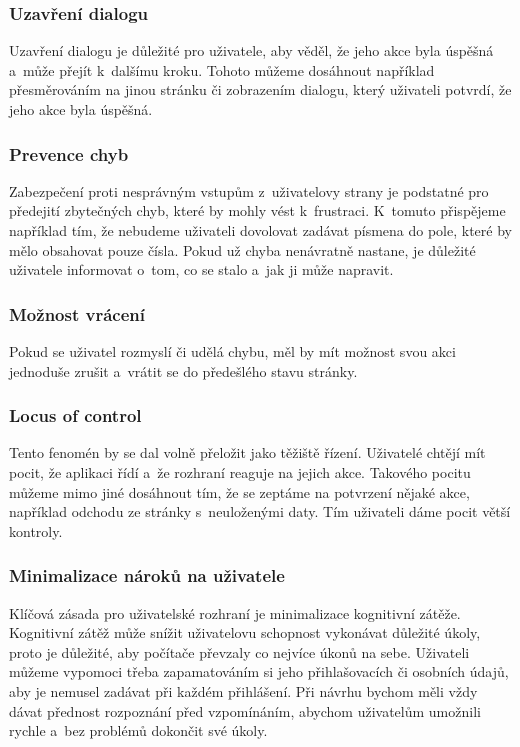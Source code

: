 \subsubsection*{Uzavření dialogu}
Uzavření dialogu je důležité pro uživatele, aby věděl, že jeho akce byla úspěšná a~může přejít k~dalšímu kroku. Tohoto můžeme dosáhnout například přesměrováním na jinou stránku či zobrazením dialogu, který uživateli potvrdí, že jeho akce byla úspěšná.

\subsubsection*{Prevence chyb}
Zabezpečení proti nesprávným vstupům z~uživatelovy strany je podstatné pro předejití zbytečných chyb, které by mohly vést k~frustraci. K~tomuto přispějeme například tím, že nebudeme uživateli dovolovat zadávat písmena do pole, které by mělo obsahovat pouze čísla. Pokud už chyba nenávratně nastane, je důležité uživatele informovat o~tom, co se stalo a~jak ji může napravit.

\subsubsection*{Možnost vrácení}
Pokud se uživatel rozmyslí či udělá chybu, měl by mít možnost svou akci jednoduše zrušit a~vrátit se do předešlého stavu stránky.

\subsubsection*{Locus of control}
Tento fenomén by se dal volně přeložit jako těžiště řízení. Uživatelé chtějí mít pocit, že aplikaci řídí a~že rozhraní reaguje na jejich akce. Takového pocitu můžeme mimo jiné dosáhnout tím, že se zeptáme na potvrzení nějaké akce, například odchodu ze stránky s~neuloženými daty. Tím uživateli dáme pocit větší kontroly.

\subsubsection*{Minimalizace nároků na uživatele}
Klíčová zásada pro uživatelské rozhraní je minimalizace kognitivní zátěže. Kognitivní zátěž může snížit uživatelovu schopnost vykonávat důležité úkoly, proto je důležité, aby počítače převzaly co nejvíce úkonů na sebe. Uživateli můžeme vypomoci třeba zapamatováním si jeho přihlašovacích či osobních údajů, aby je nemusel zadávat při každém přihlášení. Při návrhu bychom měli vždy dávat přednost rozpoznání před vzpomínáním, abychom uživatelům umožnili rychle a~bez problémů dokončit své úkoly.

